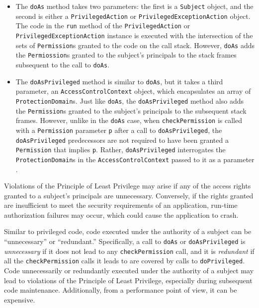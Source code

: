 \begin{itemize}
	\item The \texttt{doAs} method takes two parameters: the first
	is a \texttt{Subject} object, and the second is either a \texttt{PrivilegedAction} or
	\texttt{PrivilegedExceptionAction} object.  The code in the
	\texttt{run} method of the \texttt{PrivilegedAction} or
	\texttt{PrivilegedExceptionAction} instance is executed with the
	intersection of the sets of \texttt{Permission}s granted to the
	code on the call stack. However, \texttt{doAs} adds the
	\texttt{Permiossion}s granted to the subject's principals to the
	stack frames subsequent to the call to \texttt{doAs}.
	\item The \texttt{doAsPrivileged} method is similar to
	\texttt{doAs}, but it takes a third parameter, an
	\texttt{AccessControlContext} object, which encapsulates an array
	of \texttt{ProtectionDomain}s. Just like \texttt{doAs}, the \texttt{doAsPrivileged}
	method also adds the \texttt{Permission}s granted to the subject's
	principals to the subsequent stack frames. However, unlike in the \texttt{doAs} case, when
	\texttt{checkPermission} is called with a \texttt{Permission}
	parameter \texttt{p} after a call to \texttt{doAsPrivileged},
	the \texttt{doAsPrivileged} predecessors are not required to
	have been granted a \texttt{Permission} that implies \texttt{p}.
	Rather, \texttt{doAsPrivileged} interrogates the
	\texttt{ProtectionDomain}s in the \texttt{AccessControlContext}
	passed to it as a parameter \cite{book:J2EESecBook}.
\end{itemize}

Violations of the Principle of Least Privilege may arise if any of
the access rights granted to a subject's principals are
unnecessary.  Conversely, if the rights granted are insufficient
to meet the security requirements of an application, run-time
authorization failures may occur, which could cause the
application to crash.

Similar to privileged code, code executed under the authority of a
subject can be ``unnecessary'' or ``redundant.'' Specifically, a
call to \texttt{doAs} or \texttt{doAsPrivileged} is
\emph{unnecessary} if it does not lead to any
\texttt{checkPermission} call, and it is \emph{redundant} if all
the \texttt{checkPermission} calls it leads to are covered by
calls to \texttt{doPrivileged}. Code unnecessarily or redundantly
executed under the authority of a subject may lead to violations
of the Principle of Least Privilege, especially during subsequent
code maintenance. Additionally, from a performance point of view,
it can be expensive.

